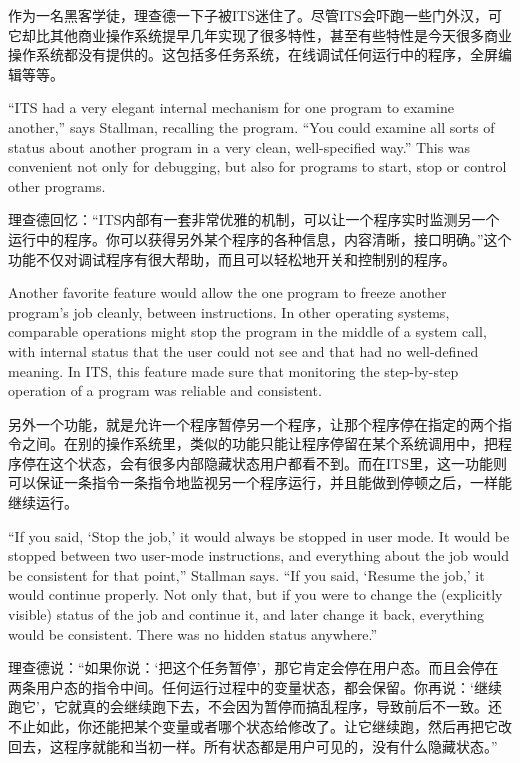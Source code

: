 \ifdefined\chs
作为一名黑客学徒，理查德一下子被ITS迷住了。尽管ITS会吓跑一些门外汉，可它却比其他商业操作系统提早几年实现了很多特性，甚至有些特性是今天很多商业操作系统都没有提供的。这包括多任务系统，在线调试任何运行中的程序，全屏编辑等等。
\fi

\ifdefined\eng
``ITS had a very elegant internal mechanism for one program to examine another,'' says Stallman, recalling the program. ``You could examine all sorts of status about another program in a very clean, well-specified way.''  This was convenient
not only for debugging, but also for programs to start, stop or control other programs.
\fi

\ifdefined\chs
理查德回忆：“ITS内部有一套非常优雅的机制，可以让一个程序实时监测另一个运行中的程序。你可以获得另外某个程序的各种信息，内容清晰，接口明确。”这个功能不仅对调试程序有很大帮助，而且可以轻松地开关和控制别的程序。
\fi

\ifdefined\eng
Another favorite feature would allow the one program to freeze another program's job cleanly, between instructions. In other operating systems, comparable operations might stop the program in the middle of a system call, with internal status that the user could not see and that had no well-defined meaning. In ITS, this feature made sure that monitoring the step-by-step operation of a program was reliable and consistent.
\fi

\ifdefined\chs
另外一个功能，就是允许一个程序暂停另一个程序，让那个程序停在指定的两个指令之间。在别的操作系统里，类似的功能只能让程序停留在某个系统调用中，把程序停在这个状态，会有很多内部隐藏状态用户都看不到。而在ITS里，这一功能则可以保证一条指令一条指令地监视另一个程序运行，并且能做到停顿之后，一样能继续运行。
\fi

\ifdefined\eng
``If you said, `Stop the job,' it would always be stopped in user mode. It would be stopped between two user-mode instructions, and everything about the job would be consistent for that point,'' Stallman says. ``If you said, `Resume the job,' it would continue properly. Not only that, but if you were to change the (explicitly visible) status of the job and continue it, and later change it back, everything would be consistent. There was no hidden status anywhere.''
\fi

\ifdefined\chs
理查德说：“如果你说：‘把这个任务暂停’，那它肯定会停在用户态。而且会停在两条用户态的指令中间。任何运行过程中的变量状态，都会保留。你再说：‘继续跑它’，它就真的会继续跑下去，不会因为暂停而搞乱程序，导致前后不一致。还不止如此，你还能把某个变量或者哪个状态给修改了。让它继续跑，然后再把它改回去，这程序就能和当初一样。所有状态都是用户可见的，没有什么隐藏状态。”
\fi

